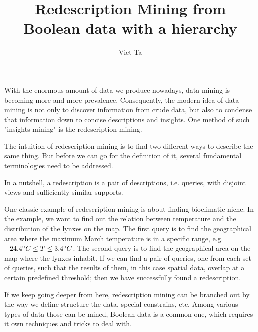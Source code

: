 \documentclass[12pt,a4paper,draft]{article}
\author{Viet Ta}
\title{Redescription Mining from Boolean data with a hierarchy}
\begin{document}
\maketitle

With the enormous amount of data we produce nowadays, data mining is becoming more and more prevalence. Consequently, the modern idea of data mining is not only to discover information from crude data, but also to condense that information down to concise descriptions and insights. One method of such "insights mining" is the redescription mining.

The intuition of redescription mining is to find two different ways to describe the same thing. But before we can go for the definition of it, several fundamental terminologies need to be addressed.


In a nutshell, a redescription is a pair of descriptions, i.e. queries, with disjoint views and sufficiently similar supports. %

One classic example of redescription mining is about finding bioclimatic niche. In the example, we want to find out the relation between temperature and the distribution of the lynxes on the map. The first query is to find the geographical area where the maximum March temperature is in a specific range, e.g. \(-24.4 \degree C \leq T \leq 3.4\degree C\). The second query is to find the geographical area on the map where the lynxes inhabit. If we can find a pair of queries, one from each set of queries, such that the results of them, in this case spatial data, overlap at a certain predefined threshold; then we have successfully found a redescription.

If we keep going deeper from here, redescription mining can be branched out by the way we define structure the data, special constrains, etc. Among various types of data those can be mined, Boolean data is a common one, which requires it own techniques and tricks to deal with.
\end{document}
